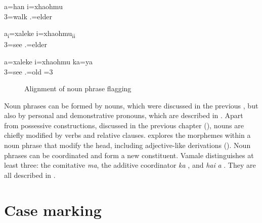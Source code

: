 \ea\label{ex:flagNP1}
\gll {\ob}a=han {\ob}i=xhaohmu{\cb\cb}  \\
 3=walk .=elder\\
\glt {}
\z 

\ea\label{ex:flagNP2}
\gll {\ob}a\textsubscript{i}=xaleke {\ob}i=xhaohmu{\cb}\textsubscript{{\upshape ii}}{\cb}\\
 3=see .=elder\\
\glt  {}
\z 

\ea\label{ex:flagNP3}
\gll a=xaleke i=xhaohmu ka=ya\\
 3=see .=old =3\\
\glt {}
\z

\begin{figure}
	\caption{Alignment of noun phrase flagging}
	\label{fig:alignment3}
\end{figure}

Noun phrases can be formed by nouns, which were discussed in the previous , but also by personal and demonstrative pronouns, which are described in . Apart from possessive constructions, discussed in the previous chapter (), nouns are chiefly modified by verbs and relative clauses.  explores the morphemes within a noun phrase that modify the head, including adjective-like derivations (). Noun phrases can be coordinated and form a new constituent. Vamale distinguishes at least three: the comitative \textit{ma}, the additive coordinator \textit{ka} , and \textit{hai} \goodtilde \textit{a} . They are all described in .

 \section{Case marking}
\label{sec:Casmark}

